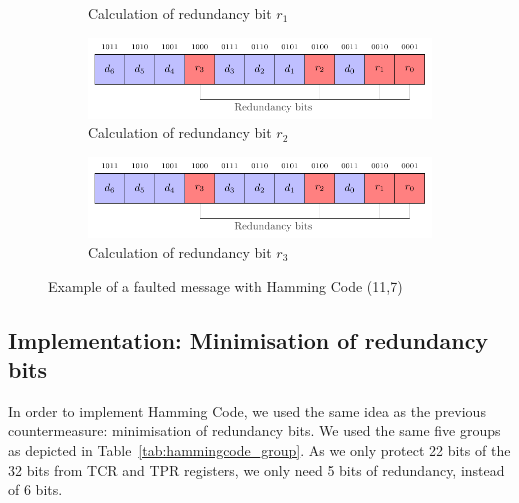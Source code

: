 \begin{figure}[ht]
\begin{subfigure}[b]{0.49\textwidth}
        \caption{Calculation of redundancy bit $r_1$}
        \label{fig:hamming_code_faulted_4}
    \end{subfigure}
    \hfill
    \begin{subfigure}[b]{0.49\textwidth}
        \includegraphics[width=\textwidth, page=15]{c5_countermeasures_dift/img/hamming_bit.pdf}
        \caption{Calculation of redundancy bit $r_2$}
        \label{fig:hamming_code_faulted_5}
    \end{subfigure}
    \hfill
    \begin{subfigure}[b]{0.49\textwidth}
        \includegraphics[width=\textwidth, page=16]{c5_countermeasures_dift/img/hamming_bit.pdf}
        \caption{Calculation of redundancy bit $r_3$}
        \label{fig:hamming_code_faulted_6}
    \end{subfigure}
    \caption{Example of a faulted message with Hamming Code (11,7)}
    \label{fig:hamming_code_faulted}
\end{figure}

\subsection{Implementation: Minimisation of redundancy bits}

In order to implement Hamming Code, we used the same idea as the previous countermeasure: minimisation of redundancy bits. We used the same five groups as depicted in Table~\ref{tab:hammingcode_group}. As we only protect 22 bits of the 32 bits from TCR and TPR registers, we only need 5 bits of redundancy, instead of 6 bits.


